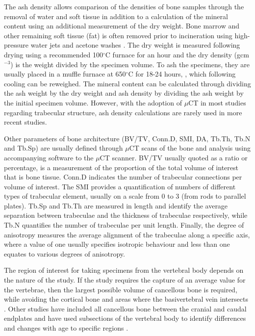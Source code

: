 The ash density allows comparison of the densities of bone samples
through the removal of water and soft tissue in addition to a
calculation of the mineral content using an additional measurement of
the dry weight. Bone marrow and other remaining soft tissue (fat) is
often removed prior to incineration using high-pressure water jets and
acetone washes \cite{keller1994predicting}. The dry weight is measured
following drying
using a recommended 100$^\circ$C furnace for an hour
\cite{keller1994predicting}
and
the dry
density (gcm$^{-3}$) is the weight divided by the specimen volume. To ash the
specimens, they are usually placed in a muffle furnace at 650$^\circ$C for
18-24
hours\cite{mosekilde1987biomechanical}, \cite{keller1994predicting}, which
following cooling can
be reweighed. The
mineral content can be calculated through dividing the ash weight by the
dry weight and ash density by dividing the ash weight by the initial
specimen volume. However, with the adoption of $\mu$CT in most studies
regarding trabecular structure, ash density calculations are rarely
used in more recent studies.

Other parameters of bone architecture (BV/TV, Conn.D, SMI, DA, Tb.Th,
Tb.N and Tb.Sp) are usually defined through $\mu$CT scans of the bone and
analysis using accompanying software to the $\mu$CT scanner. BV/TV usually
quoted as a ratio or percentage, is a measurement of the proportion of
the total volume of interest that is bone tissue. Conn.D indicates the
number of trabecular connections per volume of interest. The SMI
provides a quantification of numbers of different types of trabecular
element, usually on a scale from 0 to 3 (from rods to parallel
plates)\cite{hildebrand1997quantification}. Tb.Sp and Tb.Th are measured in
length and identify the
average separation between trabeculae and the thickness of trabeculae
respectively, while Tb.N quantifies the number of trabeculae per unit
length. Finally, the degree of anisotropy measures the average alignment
of the trabeculae along a specific axis, where a value of one usually
specifies isotropic behaviour and less than one equates to various
degrees of anisotropy\cite{hulme2007regional}.

The region of interest for taking specimens from the vertebral body
depends on the nature of the study. If the study requires the capture of an
average value for the vertebrae, then the largest possible
volume of cancellous bone is required, while avoiding the cortical bone
and areas where the basivertebral vein intersects
\cite{yoganandan2006}.
Other
studies
have included all cancellous bone between the cranial and caudal
endplates and have used subsections of the vertebral body to identify
differences and changes with age to specific regions \cite{hulme2007regional}.


